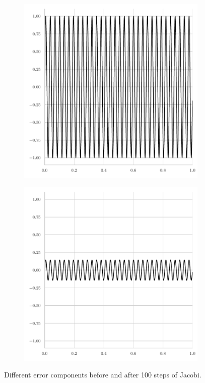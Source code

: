 \begin{figure}
\begin{subfigure}[b]{0.45\textwidth}
	\end{subfigure}
	\begin{subfigure}[b]{0.45\textwidth}
		\centering
		\includegraphics[width=\textwidth]{figures/initial_error_jacobi_64pi.pdf}
	\end{subfigure}
	\hfill
	\begin{subfigure}[b]{0.45\textwidth}
		\centering
		\includegraphics[width=\textwidth]{figures/final_error_jacobi_64pi.pdf}
	\end{subfigure}
	\caption{Different error components before and after 100 steps of Jacobi.}
	\label{fig:different-error-components-jacobi}
\end{figure}

